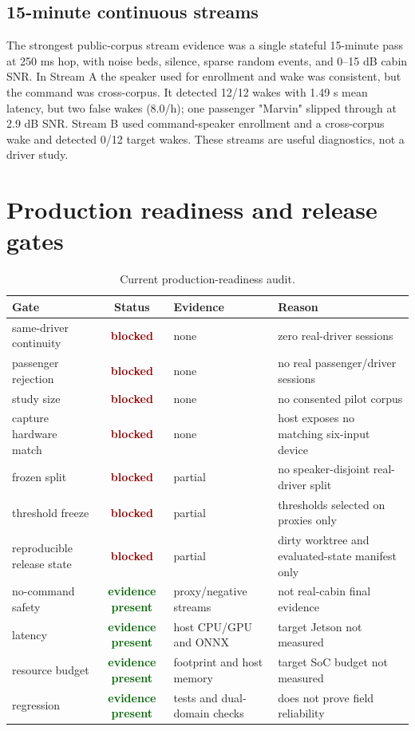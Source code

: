 \documentclass[11pt,a4paper]{article}
\newcommand{\good}{\textcolor{darkgreen}{\textbf{evidence present}}}
\newcommand{\blocked}{\textcolor{darkred}{\textbf{blocked}}}
\begin{document}
\subsection{15-minute continuous streams}

The strongest public-corpus stream evidence was a single stateful 15-minute
pass at 250 ms hop, with noise beds, silence, sparse random events, and
0--15 dB cabin SNR. In Stream A the speaker used for enrollment and wake was
consistent, but the command was cross-corpus. It detected 12/12 wakes with
1.49 s mean latency, but two false wakes (8.0/h); one passenger "Marvin"
slipped through at 2.9 dB SNR. Stream B used command-speaker enrollment and a
cross-corpus wake and detected 0/12 target wakes. These streams are useful
diagnostics, not a driver study.

\section{Production readiness and release gates}

\begin{table}[H]
\centering
\caption{Current production-readiness audit.}
\label{tab:gates}
\small
\begin{tabularx}{\linewidth}{@{}lclY@{}}
\toprule
\textbf{Gate} & \textbf{Status} & \textbf{Evidence} & \textbf{Reason}\\
\midrule
same-driver continuity & \blocked & none & zero real-driver sessions\\
passenger rejection & \blocked & none & no real passenger/driver sessions\\
study size & \blocked & none & no consented pilot corpus\\
capture hardware match & \blocked & none & host exposes no matching six-input device\\
frozen split & \blocked & partial & no speaker-disjoint real-driver split\\
threshold freeze & \blocked & partial & thresholds selected on proxies only\\
reproducible release state & \blocked & partial & dirty worktree and evaluated-state manifest only\\
no-command safety & \good & proxy/negative streams & not real-cabin final evidence\\
latency & \good & host CPU/GPU and ONNX & target Jetson not measured\\
resource budget & \good & footprint and host memory & target SoC budget not measured\\
regression & \good & tests and dual-domain checks & does not prove field reliability\\
\bottomrule
\end{tabularx}
\end{table}
\end{document}
